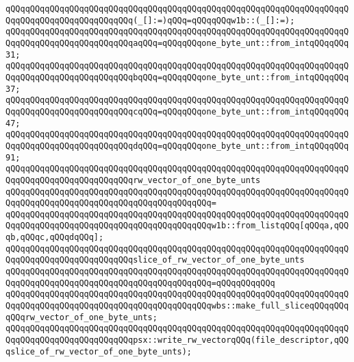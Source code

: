 \verb|qQQqqQQqqQQqqQQqqQQqqQQqqQQqqQQqqQQqqQQqqQQqqQQqqQQqqQQqqQQqqQQqqQQqqQQqqQQqqQQqqQQqqQQqqQQqqQQq(_[]:=)qQQq=qQQqqQQqw1b::(_[]:=);|\newline
\newline
\verb|qQQqqQQqqQQqqQQqqQQqqQQqqQQqqQQqqQQqqQQqqQQqqQQqqQQqqQQqqQQqqQQqqQQqqQQqqQQqqQQqqQQqqQQqqQQqqQQqaqQQq=qQQqqQQqone_byte_unt::from_intqQQqqQQq31;|\newline
\verb|qQQqqQQqqQQqqQQqqQQqqQQqqQQqqQQqqQQqqQQqqQQqqQQqqQQqqQQqqQQqqQQqqQQqqQQqqQQqqQQqqQQqqQQqqQQqqQQqbqQQq=qQQqqQQqone_byte_unt::from_intqQQqqQQq37;|\newline
\verb|qQQqqQQqqQQqqQQqqQQqqQQqqQQqqQQqqQQqqQQqqQQqqQQqqQQqqQQqqQQqqQQqqQQqqQQqqQQqqQQqqQQqqQQqqQQqqQQqcqQQq=qQQqqQQqone_byte_unt::from_intqQQqqQQq47;|\newline
\verb|qQQqqQQqqQQqqQQqqQQqqQQqqQQqqQQqqQQqqQQqqQQqqQQqqQQqqQQqqQQqqQQqqQQqqQQqqQQqqQQqqQQqqQQqqQQqqQQqdqQQq=qQQqqQQqone_byte_unt::from_intqQQqqQQq91;|\newline
\newline
\verb|qQQqqQQqqQQqqQQqqQQqqQQqqQQqqQQqqQQqqQQqqQQqqQQqqQQqqQQqqQQqqQQqqQQqqQQqqQQqqQQqqQQqqQQqqQQqqQQqrw_vector_of_one_byte_unts|\newline
\verb|qQQqqQQqqQQqqQQqqQQqqQQqqQQqqQQqqQQqqQQqqQQqqQQqqQQqqQQqqQQqqQQqqQQqqQQqqQQqqQQqqQQqqQQqqQQqqQQqqQQqqQQqqQQqqQQq=|\newline
\verb|qQQqqQQqqQQqqQQqqQQqqQQqqQQqqQQqqQQqqQQqqQQqqQQqqQQqqQQqqQQqqQQqqQQqqQQqqQQqqQQqqQQqqQQqqQQqqQQqqQQqqQQqqQQqqQQqw1b::from_listqQQq[qQQqa,qQQqb,qQQqc,qQQqdqQQq];|\newline
\newline
\verb|qQQqqQQqqQQqqQQqqQQqqQQqqQQqqQQqqQQqqQQqqQQqqQQqqQQqqQQqqQQqqQQqqQQqqQQqqQQqqQQqqQQqqQQqqQQqqQQqslice_of_rw_vector_of_one_byte_unts|\newline
\verb|qQQqqQQqqQQqqQQqqQQqqQQqqQQqqQQqqQQqqQQqqQQqqQQqqQQqqQQqqQQqqQQqqQQqqQQqqQQqqQQqqQQqqQQqqQQqqQQqqQQqqQQqqQQqqQQq=qQQqqQQqqQQq|\newline
\verb|qQQqqQQqqQQqqQQqqQQqqQQqqQQqqQQqqQQqqQQqqQQqqQQqqQQqqQQqqQQqqQQqqQQqqQQqqQQqqQQqqQQqqQQqqQQqqQQqqQQqqQQqqQQqqQQqwbs::make_full_sliceqQQqqQQqqQQqrw_vector_of_one_byte_unts;|\newline
\newline
\newline
\verb|qQQqqQQqqQQqqQQqqQQqqQQqqQQqqQQqqQQqqQQqqQQqqQQqqQQqqQQqqQQqqQQqqQQqqQQqqQQqqQQqqQQqqQQqqQQqqQQqpsx::write_rw_vectorqQQq(file_descriptor,qQQqslice_of_rw_vector_of_one_byte_unts);|\newline
